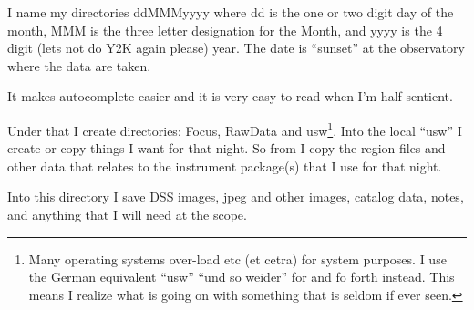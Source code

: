 \documentclass[letter,11pt,oneside]{article}
\newcommand{\dhl}[1]{{\color{verbcolor}{\texttt#1}}}
\begin{document}
I name my directories ddMMMyyyy where dd is the one or two digit
day of the month, MMM is the three letter designation for the Month,
and yyyy is the 4 digit (lets not do Y2K again please) year. The
date is ``sunset'' at the observatory where the data are taken.


It makes
autocomplete easier and it is very easy to read when I'm half sentient.

Under that I create directories: Focus, RawData and usw\footnote{Many
  operating systems over-load etc (et cetra) for system purposes. I use
  the German equivalent ``usw'' ``und so weider'' for and fo forth instead.
  This means I realize what is going on with something that is seldom if ever
  seen.}. Into the local ``usw'' I create or copy things I want for that
night. So from \dhl{~/iraf/usw} I copy the region files and other data
that relates to the instrument package(s) that I use for that night.

Into this directory I save DSS images, jpeg and other images, catalog
data, notes, and anything that I will need at the scope.













\end{document}
